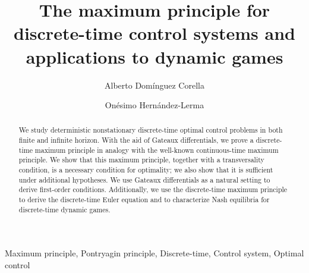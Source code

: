 \documentclass[3p]{elsarticle}
\begin{document}
	
	\begin{frontmatter}
		
		
		\title{The maximum principle for discrete-time control systems and applications
			to dynamic games}
		
		\author[rvt]{Alberto Dom\'inguez Corella}
		\author[rvt]{On\'esimo Hern\'andez-Lerma}
		
		
		\address[rvt]{Mathematics Department, CINVESTAV-IPN, A. Postal 14-740, Mexico City 07000, Mexico}
		
		
		
		
		
		
		
		
		\begin{abstract}
			We study deterministic nonstationary discrete-time  optimal  control  problems  in both finite and  infinite  horizon. With the aid of Gateaux differentials, we prove a discrete-time maximum principle in analogy with the well-known continuous-time maximum principle. We show that this maximum principle, together with a transversality condition, is a  necessary condition for optimality; we also show that it is sufficient under additional hypotheses.  We use Gateaux differentials as a natural setting to derive first-order conditions. Additionally, we use the discrete-time maximum principle to derive the discrete-time Euler equation and to characterize Nash equilibria for discrete-time dynamic games.
		\end{abstract}
		
		\begin{keyword}
			
			
			Maximum principle, Pontryagin principle, Discrete-time, Control system, Optimal control
			
		\end{keyword}
		
	\end{frontmatter}
	
\end{document}
